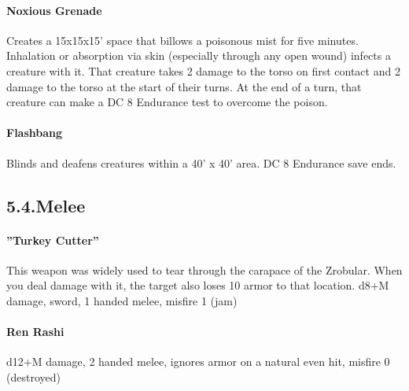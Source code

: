 \documentclass{article}
\begin{document}
\paragraph{Noxious Grenade}\label{sec-noxious-grenade}%

\noindent{}Creates a 15x15x15’ space that billows a poisonous mist for five minutes. Inhalation or absorption via skin (especially through any open wound) infects a creature with it. That creature takes 2 damage to the torso on first contact and 2 damage to the torso at the start of their turns. At the end of a turn, that creature can make a DC 8 Endurance test to overcome the poison.%

\paragraph{Flashbang}\label{sec-flashbang}%

\noindent{}Blinds and deafens creatures within a 40' x 40' area. DC 8 Endurance save ends.%

\subsection{5.4.\hspace*{0.5em}Melee}\label{sec-melee}%

\paragraph{”Turkey Cutter”}\label{sec-turkey-cutter}%

\noindent{}This weapon was widely used to tear through the carapace of the Zrobular. When you deal damage with it, the target also loses 10 armor to that location. \mdbr
{}d8+M damage, sword, 1 handed melee, misfire 1 (jam)%

\paragraph{Ren Rashi}\label{sec-ren-rashi}%

\noindent{}d12+M damage, 2 handed melee, ignores armor on a natural even hit, misfire 0 (destroyed) %
\end{document}
